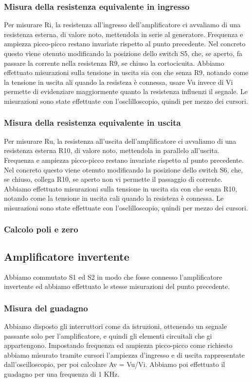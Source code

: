 \documentclass[a4paper]{article}
\begin{document}
			\subsubsection{Misura della resistenza equivalente in ingresso}
				Per misurare Ri, la resistenza all'ingresso dell'amplificatore ci avvaliamo di una resistenza esterna, di valore noto, mettendola in serie al generatore.
				Frequenza e ampiezza picco-picco restano invariate rispetto al punto precedente. 
				Nel concreto questo viene otenuto modificando la  posizione dello switch S5, che, se aperto, fa passare la corrente nella resistenza R9, se chiuso la cortocicuita.
				Abbiamo effettuato misurazioni sulla tensione in uscita sia con che senza R9, notando come la tensione in uscita ali quando la resisteza è connessa, usare Vu invece di Vi permette di evidenziare maggiormente quanto la resistenza influenzi il segnale. %
				Le misurazioni sono state effettuate con l'osclilloscopio, quindi per mezzo dei cursori.
			\subsubsection{Misura della resistenza equivalente in uscita}	
				Per misurare Ru, la resistenza all'uscita dell'amplificatore ci avvaliamo di una resistenza esterna R10, di valore noto, mettendola in parallelo all'uscita.
				Frequenza e ampiezza picco-picco restano invariate rispetto al punto precedente. 
				Nel concreto questo viene otenuto modificando la  posizione dello switch S6, che, se chiuso, collega R10, se aperto non vi permette il passaggio di corrente.
				Abbiamo effettuato misurazioni sulla tensione in uscita sia con che senza R10, notando come la tensione in uscita cali quando la resisteza è connessa. %
				Le misurazioni sono state effettuate con l'osclilloscopio, quindi per mezzo dei cursori.
				\subsubsection{Calcolo poli e zero}
		\subsection{Amplificatore invertente}
			Abbiamo commutato S1 ed S2 in modo che fosse connesso l'amplificatore invertente ed abbiamo effettuato le stesse misurazioni del punto precedente.
			\subsubsection{Misura del guadagno}
				Abbiamo disposto gli interruttori come da istruzioni, ottenendo un segnale passante solo per l'amplificatore, e quindi gli elementi circuitali che gi appartengono. %
				Impostando frequenza ed ampiezza picco-picco come richiesto abbiamo misurato tramite cursori l'ampiezza d'ingresso e di uscita rappresentate dall'oscilloscopio, per poi calcolare Av = Vu/Vi.
				Abbiamo poi effettuato il guadagno per una frequenza di 1 KHz.
\end{document}
